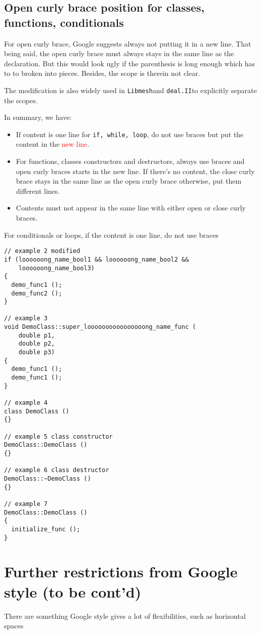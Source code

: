 \documentclass{article}
\newcommand{\libmesh}{{\tt Libmesh}}
\newcommand{\dealii}{{\tt deal.II}}
\newcommand{\red}[1]{\textcolor{red}{#1}}
\begin{document}
\subsection{Open curly brace position for classes, functions, conditionals}
For open curly brace, Google suggests always not putting it in a new line. That being said, the open curly brace must always stays in the same line as the declaration. But this would look ugly if the parenthesis is long enough which has to to broken into pieces. Besides, the scope is therein not clear.

The modification is also widely used in \libmesh and \dealii to explicitly separate the scopes.

In summary, we have:
\begin{itemize}
	\item If content is one line for {\tt if, while, loop}, do not use braces but put the content in the \red{new line}.
	\item For functions, classes constructors and destructors, always use braces and open curly braces starts in the new line. If there's no content, the close curly brace stays in the same line as the open curly brace otherwise, put them different lines.
	\item Contents must not appear in the same line with either open or close curly braces.
\end{itemize}

For conditionals or loops, if the content is one line, do not use braces
\begin{lstlisting}
// example 2 modified
if (loooooong_name_bool1 && loooooong_name_bool2 &&
    loooooong_name_bool3) 
{
  demo_func1 ();
  demo_func2 ();
}

// example 3
void DemoClass::super_loooooooooooooooong_name_func (
    double p1,
    double p2,
    double p3) 
{
  demo_func1 ();
  demo_func1 ();
}

// example 4
class DemoClass ()
{}

// example 5 class constructor
DemoClass::DemoClass ()
{}

// example 6 class destructor
DemoClass::~DemoClass ()
{}

// example 7
DemoClass::DemoClass ()
{
  initialize_func ();
}
\end{lstlisting}

\section{Further restrictions from Google style (to be cont'd)}
There are something Google style gives a lot of flexibilities, such as horizontal spaces
\end{document}
